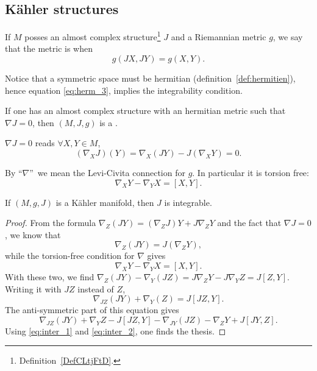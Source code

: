 \subsection{Kähler structures}

\begin{definition}  \label{DefKONtphK}
    If $M$ posses an almost complex structure\footnote{Definition~\ref{DefCLtjFtD}.} $J$ and a Riemannian metric $g$, we say that the metric is  when
    \begin{equation}
       g(JX,JY)=g(X,Y).
    \end{equation}
\end{definition}

Notice that a symmetric space must be hermitian (definition~\ref{def:hermitien}), hence equation \eqref{eq:herm_3}, implies the integrability condition.

\begin{definition}
If one has an almost complex structure with an hermitian metric such that $\nabla J=0$, then $(M,J,g)$ is a .
\end{definition}

\begin{remark}
$\nabla J=0$ reads $\forall X,Y\in M$,
\[
    (\nabla_XJ)(Y)=\nabla_X(JY)-J(\nabla_XY)=0.
\]
\end{remark}

\begin{remark}
By ``$\nabla$''\ we mean the Levi-Civita connection for $g$. In particular it is torsion free:
\[
   \nabla_XY-\nabla_YX=[X,Y].
\]
\end{remark}

\begin{lemma}
If $(M,g,J)$ is a Kähler manifold, then $J$ is integrable.
\end{lemma}

\begin{proof}
From the formula $\nabla_Z(JY)=(\nabla_ZJ)Y+J\nabla_ZY$ and the fact that $\nabla J=0$, we know that
\begin{equation}\label{eq:inter_1}
  \nabla_Z(JY)=J(\nabla_ZY),
\end{equation}
while the torsion-free condition for $\nabla$ gives
\begin{equation}\label{eq:inter_2}
\nabla_XY-\nabla_YX=[X,Y].
\end{equation}
With these two, we find $\nabla_Z(JY)-\nabla_Y(JZ)=J\nabla_ZY-J\nabla_YZ=J[Z,Y]$.  Writing it with $JZ$ instead of $Z$,
\[
   \nabla_{JZ}(JY)+\nabla_Y(Z)=J[JZ,Y].
\]
The anti-symmetric part of this equation gives
\[
   \nabla_{JZ}(JY)+\nabla_YZ-J[JZ,Y]-\nabla_{JY}(JZ)-\nabla_ZY+J[JY,Z].
\]
Using \eqref{eq:inter_1} and \eqref{eq:inter_2}, one finds the thesis.

\end{proof}

